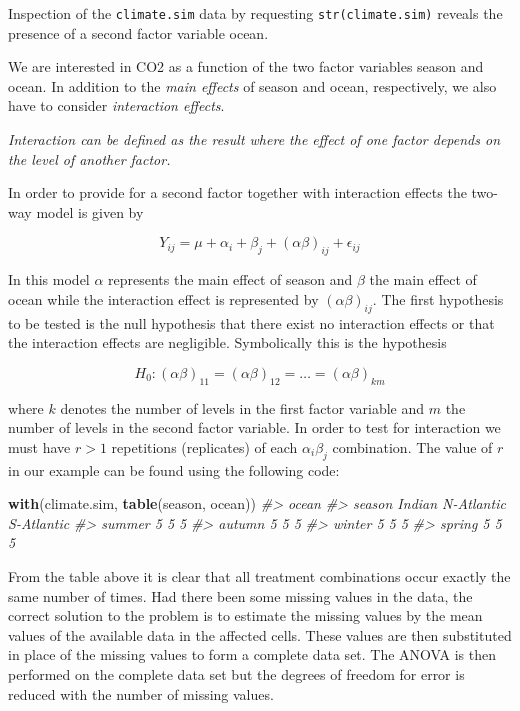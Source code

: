 \documentclass[
]{book}
\newenvironment{Shaded}{\begin{snugshade}}{\end{snugshade}}
\newcommand{\CommentTok}[1]{\textcolor[rgb]{0.56,0.35,0.01}{\textit{#1}}}
\newcommand{\FunctionTok}[1]{\textcolor[rgb]{0.13,0.29,0.53}{\textbf{#1}}}
\newcommand{\NormalTok}[1]{#1}
\begin{document}
Inspection of the \texttt{climate.sim} data by requesting \texttt{str(climate.sim)} reveals the presence of a second factor variable ocean.

We are interested in CO2 as a function of the two factor variables season and ocean. In addition to the \emph{{main effects}} of season and ocean, respectively, we also have to consider \emph{{interaction effects}}.

\emph{{Interaction can be defined as the result where the effect of one factor depends on the level of another factor.}}

In order to provide for a second factor together with interaction effects the two-way model is given by

\[
Y_{ij} = \mu + \alpha_i + \beta_j + (\alpha\beta)_{ij} + \epsilon_{ij}
\]

In this model \(\alpha\) represents the main effect of season and \(\beta\) the main effect of ocean while the interaction effect is represented by \((\alpha\beta)_{ij}\). The first hypothesis to be tested is the null hypothesis that there exist no interaction effects or that the interaction effects are negligible. Symbolically this is the hypothesis

\[
H_0: (\alpha\beta)_{11} = (\alpha\beta)_{12} = \dots = (\alpha\beta)_{km}
\]

where \(k\) denotes the number of levels in the first factor variable and \(m\) the number of levels in the second factor variable. In order to test for interaction we must have \(r > 1\) repetitions (replicates) of each \(\alpha_i\beta_j\) combination. The value of \(r\) in our example can be found using the following code:

\begin{Shaded}
\begin{Highlighting}[]
\FunctionTok{with}\NormalTok{(climate.sim, }\FunctionTok{table}\NormalTok{(season, ocean))}
\CommentTok{\#\textgreater{}         ocean}
\CommentTok{\#\textgreater{} season   Indian N{-}Atlantic S{-}Atlantic}
\CommentTok{\#\textgreater{}   summer      5          5          5}
\CommentTok{\#\textgreater{}   autumn      5          5          5}
\CommentTok{\#\textgreater{}   winter      5          5          5}
\CommentTok{\#\textgreater{}   spring      5          5          5}
\end{Highlighting}
\end{Shaded}

From the table above it is clear that all treatment combinations occur exactly the same number of times. Had there been some missing values in the data, the correct solution to the problem is to estimate the missing values by the mean values of the available data in the affected cells. These values are then substituted in place of the missing values to form a complete data set. The ANOVA is then performed on the complete data set but the degrees of freedom for error is reduced with the number of missing values.
\end{document}
